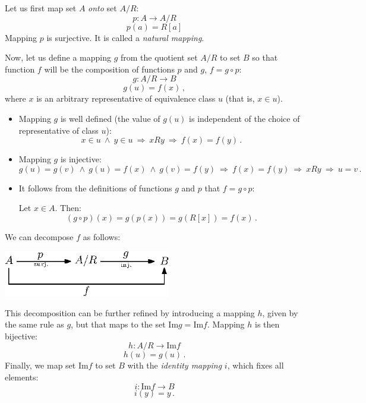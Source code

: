 \documentclass[11pt,paper=b5,footinclude,headinclude]{scrbook} %
\def\inn {{~\wedge~}}
\def\sledi {{~\Rightarrow~}}
\def\cee {{~\Leftrightarrow~}}
\theoremstyle{remark}
\theoremstyle{definition} %
\theoremstyle{theorem} %
\begin{document}
Let us first map set $A$ {\em onto} set $A/R$:
$$p:A{\to} A/R$$
$$p(a) = R[a]$$
Mapping $p$ is surjective. It is called a {\em natural mapping}.

Now, let us define a mapping $g$ from  the quotient set $A/R$ to set $B$ so that
function $f$ will be the composition of functions $p$ and $g$, $f = g\circ p$:
$$g:A/R{\to} B$$
$$g(u) = f(x)\,,$$
where $x$ is an arbitrary representative of equivalence class $u$ (that is, $x\in u$).

\begin{itemize}
  \item Mapping  $g$ is well defined (the value of $g(u)$ is independent of the choice of representative of class $u$):
$$x\in u\inn y\in u \sledi xRy \sledi f(x) = f(y)\,.$$
  \item Mapping $g$ is injective:
$$g(u) = g(v) \inn g(u) = f(x) \inn g(v) = f(y) \sledi f(x) = f(y) \sledi xRy \sledi  u = v\,.$$
  \item It follows from the definitions of functions $g$ and $p$ that  $f = g\circ p$:

Let $x\in A$. Then:
$$(g\circ p)(x) = g(p(x)) = g(R[x]) = f(x)\,.$$
\end{itemize}

We can decompose $f$ as follows:
\begin{center}
\includegraphics[height=20mm]{dekompozicija.eps}
\end{center}

%
%
This decomposition can be further refined by
introducing a mapping $h$, given by the same rule as $g$, but that maps to the set $\textrm{Im}g = \textrm{Im}f$.
Mapping $h$ is then bijective:
$$h:A/R{\to} \textrm{Im}f$$
$$h(u) = g(u)\,.$$
Finally, we map set $\textrm{Im}f$ to set $B$ with the  {\em identity mapping} $i$, which fixes all elements:
$$i:\textrm{Im}f{\to}B$$
$$i(y) = y\,.$$
\end{document}
